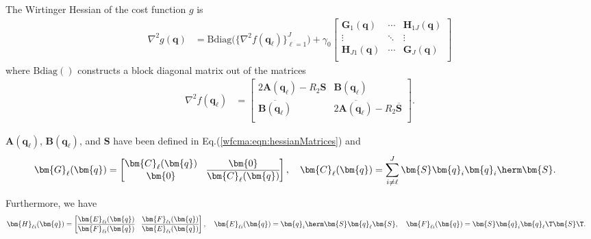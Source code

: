 The Wirtinger Hessian of the cost function $g$ is
\begin{align}
\nabla^2 g(\bm{q})&= \mathrm{Bdiag}\Big(\big\{\nabla^2 f(\bm{q}_{\ell})\big\}_{\ell=1}^J\Big)
+\gamma_0\begin{bmatrix}
	\bm{G}_{1}(\bm{q}) & \cdots&\bm{H}_{1 J}(\bm{q})\\
	\vdots & \ddots&\vdots\\
	\bm{H}_{J 1}(\bm{q}) & \cdots&\bm{G}_{J}(\bm{q})\\
\end{bmatrix}\label{wfcma:eqn:hessian_msr}
\end{align}
where $\mathrm{Bdiag}()$ constructs a block diagonal matrix out of the matrices 
\begin{align}
\nabla^2 f(\bm{q}_{\ell}) &=\begin{bmatrix}
	2\bm{A}(\bm{q}_{\ell})-R_2\bm{S} & \bm{B}(\bm{q}_{\ell})\\%
	\overline{\bm{B}(\bm{q}_{\ell})} &2\overline{\bm{A}(\bm{q}_{\ell})}-R_2\overline{\bm{S}}\\
\end{bmatrix}.\label{wfcma:eqn:hessianMatricesV_msr}
\end{align}

$\bm{A}(\bm{q}_{\ell})$, $\bm{B}(\bm{q}_{\ell})$, and $\bm{S}$ have been defined in Eq.(\ref{wfcma:eqn:hessianMatrices}) and %
\begin{align}
\bm{G}_{\ell}(\bm{q}) &=\begin{bmatrix}
	\bm{C}_{\ell}(\bm{q}) & \bm{0}\\%
	\bm{0} &\overline{\bm{C}_{\ell}(\bm{q})}\\
\end{bmatrix},\quad
\bm{C}_{\ell}(\bm{q}) = \sum_{i\neq \ell}^J\bm{S}\bm{q}_i\bm{q}_i\herm\bm{S}. \label{wfcma:eqn:hessianC_msr}
\end{align}

Furthermore, we have 
\begin{align}
\bm{H}_{\ell i}(\bm{q}) &=\begin{bmatrix}
	\bm{E}_{\ell i}(\bm{q}) & \bm{F}_{\ell i}(\bm{q})\\%
	\overline{\bm{F}_{\ell i}(\bm{q})} &\overline{\bm{E}_{\ell i}(\bm{q})}
\end{bmatrix},\quad
\bm{E}_{\ell i}(\bm{q}) =\bm{q}_i\herm\bm{S}\bm{q}_{\ell}\bm{S},\quad
\bm{F}_{\ell i}(\bm{q}) = \bm{S}\bm{q}_i\bm{q}_{\ell}\T\bm{S}\T.\label{wfcma:eqn:hessianF_msr}
\end{align}

